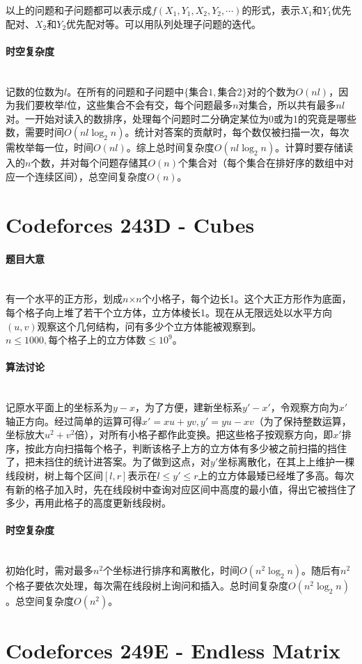 \documentclass[UTF8]{ctexart}
\newcommand{\myparagraph}[1]{\paragraph{#1}\mbox{}\\}
\theoremstyle{nonumberplain}
\begin{document}
			以上的问题和子问题都可以表示成$f({X_1,Y_1},{X_2,Y_2},\cdots)$的形式，表示$X_1$和$Y_1$优先配对、$X_2$和$Y_2$优先配对等。可以用队列处理子问题的迭代。
		
		\myparagraph{时空复杂度}
		
			记数的位数为$l$。在所有的问题和子问题中$\{\mbox{集合}1,\mbox{集合}2\}$对的个数为$O(nl)$，因为我们要枚举$l$位，这些集合不会有交，每个问题最多$n$对集合，所以共有最多$nl$对。一开始对读入的数排序，处理每个问题时二分确定某位为0或为1的究竟是哪些数，需要时间$O(nl\log_2n)$。统计对答案的贡献时，每个数仅被扫描一次，每次需枚举每一位，时间$O(nl)$。综上总时间复杂度$O(nl\log_2n)$。计算时要存储读入的$n$个数，并对每个问题存储其$O(n)$个集合对（每个集合在排好序的数组中对应一个连续区间），总空间复杂度$O(n)$。
	
	\section{Codeforces 243D - Cubes}
	
		\myparagraph{题目大意}
		
			有一个水平的正方形，划成$n$×$n$个小格子，每个边长1。这个大正方形作为底面，每个格子向上堆了若干个立方体，立方体棱长1。现在从无限远处以水平方向$(u,v)$观察这个几何结构，问有多少个立方体能被观察到。$n \leq 1000, \mbox{每个格子上的立方体数} \leq 10^9$。
		
		\myparagraph{算法讨论}
		
			记原水平面上的坐标系为$y-x$，为了方便，建新坐标系$y'-x'$，令观察方向为$x'$轴正方向。经过简单的运算可得$x'=xu+yv, y'=yu-xv$（为了保持整数运算，坐标放大$u^2+v^2$倍），对所有小格子都作此变换。把这些格子按观察方向，即$x'$排序，按此方向扫描每个格子，判断该格子上方的立方体有多少被之前扫描的挡住了，把未挡住的统计进答案。为了做到这点，对$y'$坐标离散化，在其上上维护一棵线段树，树上每个区间$[l,r]$表示在$l \leq y' \leq r$上的立方体最矮已经堆了多高。每次有新的格子加入时，先在线段树中查询对应区间中高度的最小值，得出它被挡住了多少，再用此格子的高度更新线段树。
		
		\myparagraph{时空复杂度}
		
			初始化时，需对最多$n^2$个坐标进行排序和离散化，时间$O(n^2\log_2n)$。随后有$n^2$个格子要依次处理，每次需在线段树上询问和插入。总时间复杂度$O(n^2\log_2n)$。总空间复杂度$O(n^2)$。
	
	\section{Codeforces 249E - Endless Matrix}
	
\end{document}

